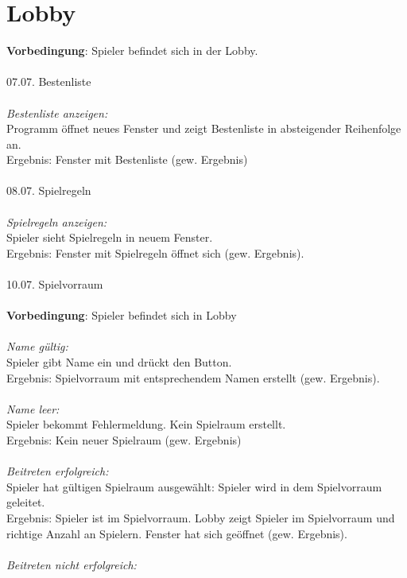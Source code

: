 \documentclass[10pt]{report}
\begin{document}
	\chapter{Lobby}
		\textbf{Vorbedingung}: Spieler befindet sich in der Lobby. \\
		\\
		07.07. Bestenliste \\
		\\
		\textsl{Bestenliste anzeigen:} \\
		Programm \"offnet neues Fenster und zeigt Bestenliste in absteigender Reihenfolge an. \\
		Ergebnis: Fenster mit Bestenliste (gew. Ergebnis) \\
		\\
		08.07. Spielregeln \\
		\\
		\textsl{Spielregeln anzeigen:} \\
		Spieler sieht Spielregeln in neuem Fenster. \\
		Ergebnis: Fenster mit Spielregeln \"offnet sich (gew. Ergebnis). \\
		\\
		10.07. Spielvorraum \\
		\\
		\textbf{Vorbedingung}: Spieler befindet sich in Lobby \\
		\\
		\textsl{Name g\"ultig:} \\
		Spieler gibt Name ein und dr\"uckt den Button. \\
		Ergebnis: Spielvorraum mit entsprechendem Namen erstellt (gew. Ergebnis). \\
		\\
		\textsl{Name leer:} \\
		Spieler bekommt Fehlermeldung. Kein Spielraum erstellt. \\
		Ergebnis: Kein neuer Spielraum (gew. Ergebnis) \\
		\\
		\textsl{Beitreten erfolgreich:} \\
		Spieler hat g\"ultigen Spielraum ausgew\"ahlt: Spieler wird in dem Spielvorraum 							geleitet. \\
		Ergebnis: Spieler ist im Spielvorraum. Lobby zeigt Spieler im Spielvorraum und richtige Anzahl an 		Spielern. Fenster hat sich ge\"offnet (gew. Ergebnis). \\
		\\
		\textsl{Beitreten nicht erfolgreich:} \\
\end{document}
